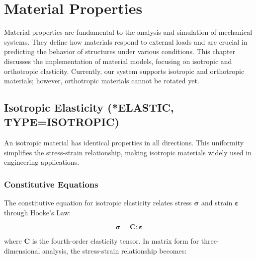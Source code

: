 \chapter{Material Properties}
\label{chap:material_properties}

Material properties are fundamental to the analysis and simulation of mechanical systems. They define how materials respond to external loads and are crucial in predicting the behavior of structures under various conditions. This chapter discusses the implementation of material models, focusing on isotropic and orthotropic elasticity. Currently, our system supports isotropic and orthotropic materials; however, orthotropic materials cannot be rotated yet.

\section{Isotropic Elasticity (*ELASTIC, TYPE=ISOTROPIC)}

An isotropic material has identical properties in all directions. This uniformity simplifies the stress-strain relationship, making isotropic materials widely used in engineering applications.

\subsection{Constitutive Equations}

The constitutive equation for isotropic elasticity relates stress $\boldsymbol{\sigma}$ and strain $\boldsymbol{\varepsilon}$ through Hooke's Law:

\[
\boldsymbol{\sigma} = \mathbf{C} : \boldsymbol{\varepsilon}
\]

where $\mathbf{C}$ is the fourth-order elasticity tensor. In matrix form for three-dimensional analysis, the stress-strain relationship becomes:

